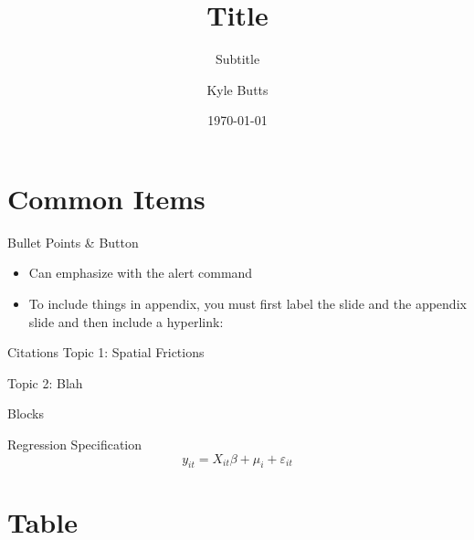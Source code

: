 \documentclass[aspectratio=43]{beamer}
\title{Title}
\subtitle{Subtitle}
\date{\today}
\author{Kyle Butts}
\begin{document}
\maketitle

\section{Common Items}

\begin{frame}{Bullet Points \& Button}\label{main1}
    \begin{itemize}
        \item Can emphasize with \alert{the alert command}
        
        \item To include things in appendix, you must first label the slide and the appendix slide and then include a hyperlink:
        
        \hyperlink{appendix1}{}
    \end{itemize}
\end{frame}

\begin{frame}{Citations}
    Topic 1: Spatial Frictions
    \begin{citecolor}
    \end{citecolor}

    Topic 2: Blah 
    \begin{citecolor}
    \end{citecolor}
\end{frame}

\begin{frame}{Blocks}
    \begin{block}{Regression Specification}
        \[
            y_{it} = X_{it} \beta + \mu_i + \varepsilon_{it}
        \]
    \end{block}
\end{frame}



\section{Table}
\end{document}
